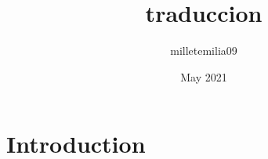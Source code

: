 \documentclass{article}
\title{traduccion}
\author{milletemilia09 }
\date{May 2021}
\begin{document}
\maketitle

\section{Introduction}
\end{document}
